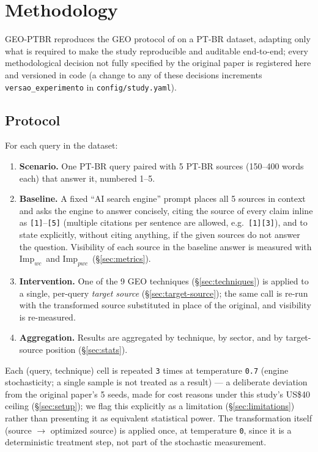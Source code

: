 \documentclass[11pt,a4paper]{article}
\newcommand{\Impwc}{\ensuremath{\mathrm{Imp}_{wc}}}
\newcommand{\Imppwc}{\ensuremath{\mathrm{Imp}_{pwc}}}
\begin{document}
\section{Methodology}
\label{sec:methodology}

GEO-PTBR reproduces the GEO protocol of \citet{aggarwal2024geo} on a PT-BR
dataset, adapting only what is required to make the study reproducible and
auditable end-to-end; every methodological decision not fully specified by
the original paper is registered here and versioned in code (a change to
any of these decisions increments \texttt{versao\_experimento} in
\texttt{config/study.yaml}).

\subsection{Protocol}
\label{sec:protocol}

For each query in the dataset:
\begin{enumerate}[nosep]
  \item \textbf{Scenario.} One PT-BR query paired with 5 PT-BR sources
    (150--400 words each) that answer it, numbered 1--5.
  \item \textbf{Baseline.} A fixed ``AI search engine'' prompt places all 5
    sources in context and asks the engine to answer concisely, citing the
    source of every claim inline as \texttt{[1]}--\texttt{[5]} (multiple
    citations per sentence are allowed, e.g.\ \texttt{[1][3]}), and to state
    explicitly, without citing anything, if the given sources do not answer
    the question. Visibility of each source in the baseline answer is
    measured with \Impwc\ and \Imppwc\ (\S\ref{sec:metrics}).
  \item \textbf{Intervention.} One of the 9 GEO techniques
    (\S\ref{sec:techniques}) is applied to a single, per-query \emph{target
    source} (\S\ref{sec:target-source}); the same call is re-run with the
    transformed source substituted in place of the original, and visibility
    is re-measured.
  \item \textbf{Aggregation.} Results are aggregated by technique, by
    sector, and by target-source position (\S\ref{sec:stats}).
\end{enumerate}

Each (query, technique) cell is repeated \texttt{3} times at temperature
\texttt{0.7} (engine stochasticity; a single sample is not treated as a
result) --- a deliberate deviation from the original paper's 5 seeds, made for
cost reasons under this study's US\$40 ceiling (\S\ref{sec:setup}); we flag
this explicitly as a limitation (\S\ref{sec:limitations}) rather than
presenting it as equivalent statistical power. The transformation itself
(source $\to$ optimized source) is applied once, at temperature \texttt{0},
since it is a deterministic treatment step, not part of the stochastic
measurement.
\end{document}
